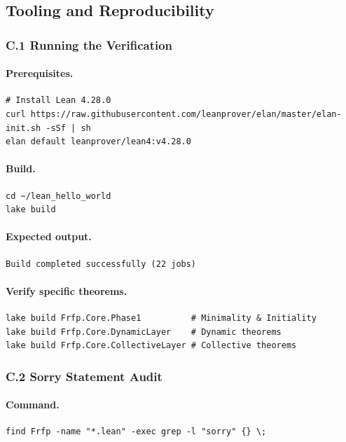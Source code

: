 \subsection{Tooling and Reproducibility}

\subsubsection*{C.1 Running the Verification}
\paragraph{Prerequisites.}
\begin{verbatim}
# Install Lean 4.28.0
curl https://raw.githubusercontent.com/leanprover/elan/master/elan-init.sh -sSf | sh
elan default leanprover/lean4:v4.28.0
\end{verbatim}

\paragraph{Build.}
\begin{verbatim}
cd ~/lean_hello_world
lake build
\end{verbatim}

\paragraph{Expected output.}
\begin{verbatim}
Build completed successfully (22 jobs)
\end{verbatim}

\paragraph{Verify specific theorems.}
\begin{verbatim}
lake build Frfp.Core.Phase1          # Minimality & Initiality
lake build Frfp.Core.DynamicLayer    # Dynamic theorems
lake build Frfp.Core.CollectiveLayer # Collective theorems
\end{verbatim}

\subsubsection*{C.2 Sorry Statement Audit}
\paragraph{Command.}
\begin{verbatim}
find Frfp -name "*.lean" -exec grep -l "sorry" {} \;
\end{verbatim}

